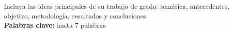 Incluya las ideas principales de su trabajo de grado: tem\'atica, antecedentes, objetivo, metodolog\'ia, resultados y conclusiones.\\
\textbf{Palabras clave:} hasta 7 palabras